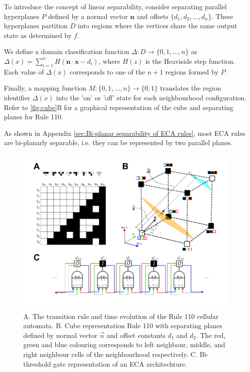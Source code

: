 To introduce the concept of linear separability, consider separating parallel hyperplanes \( P \) defined by a normal vector \( \mathbf{n} \) and offsets \( \{d_1, d_2, \ldots, d_n\} \). These hyperplanes partition \( D \) into regions where the vertices share the same output state as determined by \( f \).

We define a domain classification function \( \Delta: D \to \{0, 1, \ldots, n\} \) as \( \Delta(x) = \sum_{i=1}^{n} H(\mathbf{n} \cdot \mathbf{x} - d_i) \), where \( H(z) \) is the Heaviside step function. Each value of \( \Delta(x) \) corresponds to one of the \( n+1 \) regions formed by \( P \).

Finally, a mapping function \( M: \{0, 1, \ldots, n\} \to \{0, 1\} \) translates the region identifier \( \Delta(x) \) into the 'on' or 'off' state for each neighbourhood configuration.
Refer to \autoref*{fig:cube}B for a graphical representation of the cube and separating planes for Rule 110.

As shown in Appendix \ref*{sec:Bi-planar separability of ECA rules}, most ECA rules are bi-planarly separable, i.e. they can be represented by two parallel planes. 


\begin{figure}[ht]
    
    \centering
    \includegraphics[width=\textwidth]{images/SVGs/Cube.pdf}
    \caption{A. The transition rule and time evolution of the Rule 110 cellular automata. B. Cube representation Rule 110 with separating planes defined by normal vector $\overrightarrow{n}$ and offset constants $d_1$ and $d_2$. The red, green and blue colouring corresponds to left neighbour, middle, and right neighbour cells of the neighbourhood respectively. C. Bi-threshold gate representation of an ECA architechture.}
    \label{fig:cube}
\end{figure}
